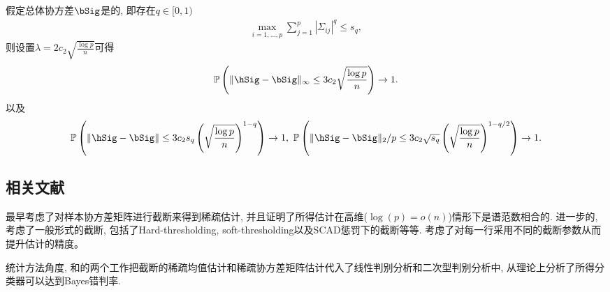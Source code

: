 \begin{prop}[渐近稀疏协方差估计]
	假定总体协方差$\bSig$是的, 即存在$q \in [0,1)$
	\begin{align*}
		\max_{i=1,\ldots,p} \sum_{j=1}^p |\Sigma_{ij}|^q \leq s_q,
	\end{align*}	
	则设置$\lambda=2c_2\sqrt{\frac{\log p}{n}}$可得
	\begin{align*}
		\Pr\left(\|\hSig-\bSig\|_\infty\leq 3c_2\sqrt{\frac{\log p}{n}}\right) \to 1.
	\end{align*}
	以及
	\begin{align*}
		\Pr\left(\|\hSig-\bSig\| \leq 3 c_2 s_q \left(\sqrt{\frac{\log p}{n}} \right)^{1-q} \right) \to 1,~\Pr\left(\|\hSig-\bSig\|_2/p \leq 3 c_2 \sqrt{s_q} \left(\sqrt{\frac{\log p}{n}} \right)^{1-q/2}\right) \to 1.
	\end{align*}
	\end{prop}
\subsection{相关文献}
\cite{bickel2008covariance}最早考虑了对样本协方差矩阵进行截断来得到稀疏估计, 并且证明了所得估计在高维($\log(p)=o(n)$)情形下是谱范数相合的. 进一步的, \cite{rothman2009generalized}考虑了一般形式的截断, 包括了Hard-thresholding, soft-thresholding以及SCAD惩罚下的截断等等. \cite{cai2011adaptive}考虑了对每一行采用不同的截断参数从而提升估计的精度。

统计方法角度, \cite{shao2011sparse}和\cite{li2015sparse}的两个工作把截断的稀疏均值估计和稀疏协方差矩阵估计代入了线性判别分析和二次型判别分析中, 从理论上分析了所得分类器可以达到Bayes错判率.